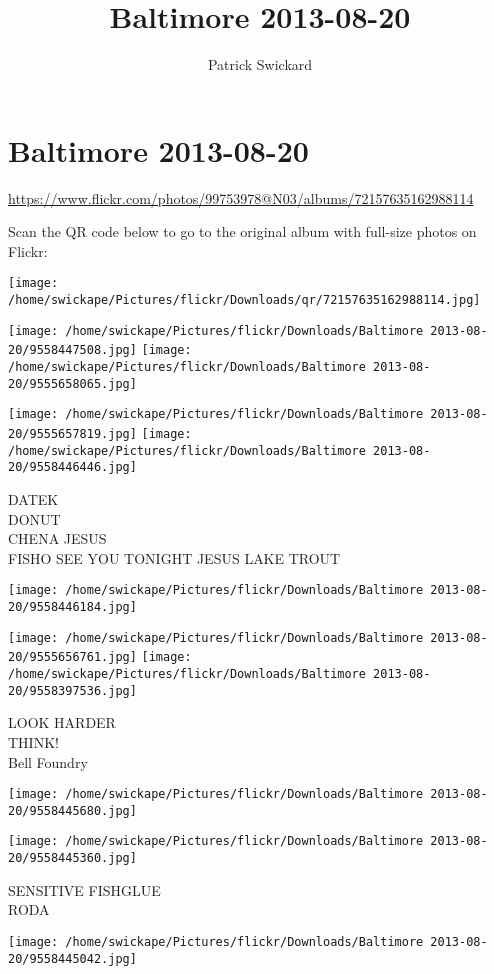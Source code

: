 \documentclass[10pt,letterpaper]{article}
\title{Baltimore 2013-08-20}
\author{Patrick Swickard}
\date{}
\begin{document}
\section*{Baltimore 2013-08-20}

\url{https://www.flickr.com/photos/99753978@N03/albums/72157635162988114}

Scan the QR code below to go to the original album with full-size photos on Flickr:

\texttt{[image: /home/swickape/Pictures/flickr/Downloads/qr/72157635162988114.jpg]}
\pagebreak

\texttt{[image: /home/swickape/Pictures/flickr/Downloads/Baltimore 2013-08-20/9558447508.jpg]}
\texttt{[image: /home/swickape/Pictures/flickr/Downloads/Baltimore 2013-08-20/9555658065.jpg]}

\texttt{[image: /home/swickape/Pictures/flickr/Downloads/Baltimore 2013-08-20/9555657819.jpg]}
\texttt{[image: /home/swickape/Pictures/flickr/Downloads/Baltimore 2013-08-20/9558446446.jpg]}

DATEK\\
DONUT\\
CHENA JESUS\\
FISHO SEE YOU TONIGHT JESUS LAKE TROUT
\pagebreak

\texttt{[image: /home/swickape/Pictures/flickr/Downloads/Baltimore 2013-08-20/9558446184.jpg]}

\vspace{0.25in}
\texttt{[image: /home/swickape/Pictures/flickr/Downloads/Baltimore 2013-08-20/9555656761.jpg]}
\texttt{[image: /home/swickape/Pictures/flickr/Downloads/Baltimore 2013-08-20/9558397536.jpg]}

LOOK HARDER\\
THINK!\\
Bell Foundry
\pagebreak

\texttt{[image: /home/swickape/Pictures/flickr/Downloads/Baltimore 2013-08-20/9558445680.jpg]}

\vspace{0.25in}
\texttt{[image: /home/swickape/Pictures/flickr/Downloads/Baltimore 2013-08-20/9558445360.jpg]}

SENSITIVE FISHGLUE\\
RODA
\pagebreak

\texttt{[image: /home/swickape/Pictures/flickr/Downloads/Baltimore 2013-08-20/9558445042.jpg]}
\end{document}
